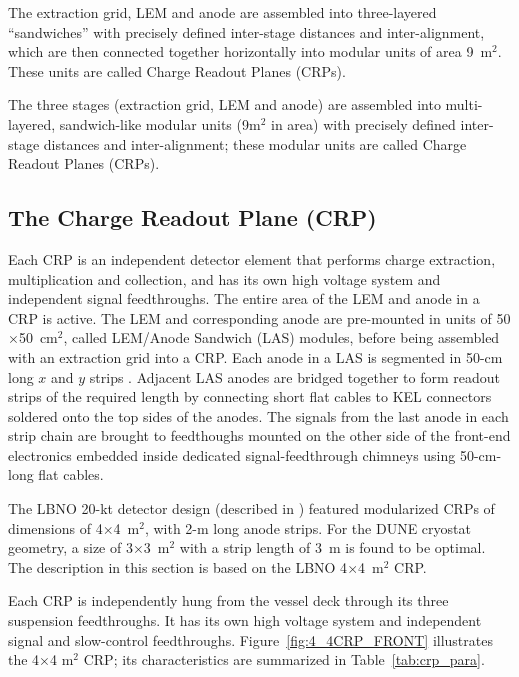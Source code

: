 The extraction grid, LEM and anode are assembled into three-layered ``sandwiches'' with precisely defined inter-stage distances and inter-alignment,  which are then connected together horizontally into
modular units of area \num{9}~m$^2$. These units are called Charge Readout Planes (CRPs).


The three stages (extraction grid, LEM and anode) are assembled into
multi-layered, sandwich-like modular units (\num{9}m$^2$ in area) with
precisely defined inter-stage distances and inter-alignment; these
modular units are called Charge Readout Planes (CRPs).
   
\subsection{The Charge Readout Plane (CRP)}

Each CRP is an independent detector element that performs charge
extraction, multiplication and collection, and has its own high
voltage system and independent signal feedthroughs. The entire area of
the LEM and anode in a CRP is active.
The LEM and corresponding anode are pre-mounted in units of 50$\times$50~cm$^2$, called
LEM/Anode Sandwich (LAS) modules, before being assembled with an extraction
grid into a CRP. Each
anode in a LAS is segmented in 50-cm long $x$ and $y$ strips . Adjacent LAS anodes
are bridged together to form readout strips of the required length by
connecting short flat cables to KEL connectors soldered onto the top
sides of the anodes. The signals from the last anode in each %
strip chain are brought to feedthoughs
mounted on the other side of the front-end electronics embedded inside
dedicated signal-feedthrough chimneys using 50-cm-long flat cables. 

The LBNO 20-kt detector design (described in \anxlbnob) featured
modularized CRPs of dimensions of 4$\times$4~m$^2$, with 2-m long
anode strips. For the DUNE cryostat geometry, a size of 3$\times$3~m$^2$
with a strip length of 3~m is found to be optimal. The description in
this section is based on the LBNO 4$\times$4~m$^2$ CRP.

Each CRP is independently hung from the vessel deck through its three
suspension feedthroughs. It has its own high voltage system and %
independent signal and slow-control feedthroughs.
Figure~\ref{fig:4_4CRP_FRONT} illustrates the 4$\times$4 m$^2$ CRP;
its characteristics are summarized in Table~\ref{tab:crp_para}.

